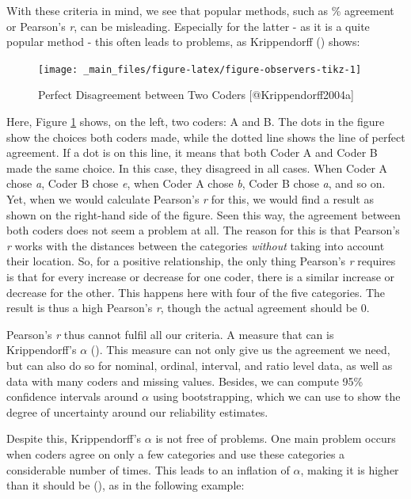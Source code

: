 \documentclass[
]{book}
\begin{document}
With these criteria in mind, we see that popular methods, such as \% agreement or Pearson's \emph{r}, can be misleading. Especially for the latter - as it is a quite popular method - this often leads to problems, as Krippendorff () shows:

\hfill\break

\begin{figure}
\texttt{[image: \_main\_files/figure-latex/figure-observers-tikz-1]} \caption{Perfect Disagreement between Two Coders [@Krippendorff2004a]}\label{fig:figure-observers-tikz}
\end{figure}

\hfill\break

Here, Figure \ref{fig:figure-observers-tikz} shows, on the left, two coders: A and B. The dots in the figure show the choices both coders made, while the dotted line shows the line of perfect agreement. If a dot is on this line, it means that both Coder A and Coder B made the same choice. In this case, they disagreed in all cases. When Coder A chose \emph{a}, Coder B chose \emph{e}, when Coder A chose \emph{b}, Coder B chose \emph{a}, and so on. Yet, when we would calculate Pearson's \emph{r} for this, we would find a result as shown on the right-hand side of the figure. Seen this way, the agreement between both coders does not seem a problem at all. The reason for this is that Pearson's \emph{r} works with the distances between the categories \emph{without} taking into account their location. So, for a positive relationship, the only thing Pearson's \emph{r} requires is that for every increase or decrease for one coder, there is a similar increase or decrease for the other. This happens here with four of the five categories. The result is thus a high Pearson's \emph{r}, though the actual agreement should be 0.

Pearson's \emph{r} thus cannot fulfil all our criteria. A measure that can is Krippendorff's \(\alpha\) (). This measure can not only give us the agreement we need, but can also do so for nominal, ordinal, interval, and ratio level data, as well as data with many coders and missing values. Besides, we can compute 95\% confidence intervals around \(\alpha\) using bootstrapping, which we can use to show the degree of uncertainty around our reliability estimates.

Despite this, Krippendorff's \(\alpha\) is not free of problems. One main problem occurs when coders agree on only a few categories and use these categories a considerable number of times. This leads to an inflation of \(\alpha\), making it is higher than it should be (), as in the following example:
\end{document}
